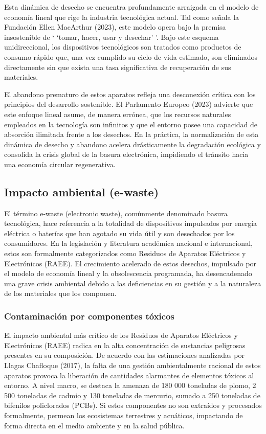 \documentclass[stu,12pt,a4paper]{apa7}
\begin{document}
Esta dinámica de desecho se encuentra profundamente arraigada en el modelo de economía lineal que rige la industria tecnológica actual. Tal como señala la Fundación Ellen MacArthur (2023), este modelo opera bajo la premisa insostenible de ` `tomar, hacer, usar y desechar' '. Bajo este esquema unidireccional, los dispositivos tecnológicos son tratados como productos de consumo rápido que, una vez cumplido su ciclo de vida estimado, son eliminados directamente sin que exista una tasa significativa de recuperación de sus materiales.

El abandono prematuro de estos aparatos refleja una desconexión crítica con los principios del desarrollo sostenible. El Parlamento Europeo (2023) advierte que este enfoque lineal asume, de manera errónea, que los recursos naturales empleados en la tecnología son infinitos y que el entorno posee una capacidad de absorción ilimitada frente a los desechos. En la práctica, la normalización de esta dinámica de desecho y abandono acelera drásticamente la degradación ecológica y consolida la crisis global de la basura electrónica, impidiendo el tránsito hacia una economía circular regenerativa.

\subsection{ Impacto ambiental (e-waste)}
El término e-waste (electronic waste), comúnmente denominado basura tecnológica, hace referencia a la totalidad de dispositivos impulsados por energía eléctrica o baterías que han agotado su vida útil y son desechados por los consumidores. En la legislación y literatura académica nacional e internacional, estos son formalmente categorizados como Residuos de Aparatos Eléctricos y Electrónicos (RAEE). El crecimiento acelerado de estos desechos, impulsado por el modelo de economía lineal y la obsolescencia programada, ha desencadenado una grave crisis ambiental debido a las deficiencias en su gestión y a la naturaleza de los materiales que los componen. 

    \subsubsection{Contaminación por componentes tóxicos}
     El impacto ambiental más crítico de los Residuos de Aparatos Eléctricos y Electrónicos (RAEE) radica en la alta concentración de sustancias peligrosas presentes en su composición. De acuerdo con las estimaciones analizadas por Llagas Chafloque (2017), la falta de una gestión ambientalmente racional de estos aparatos provoca la liberación de cantidades alarmantes de elementos tóxicos al entorno. A nivel macro, se destaca la amenaza de 180 000 toneladas de plomo, 2 500 toneladas de cadmio y 130 toneladas de mercurio, sumado a 250 toneladas de bifenilos policlorados (PCBs). Si estos componentes no son extraídos y procesados formalmente, permean los ecosistemas terrestres y acuáticos, impactando de forma directa en el medio ambiente y en la salud pública.
     
\end{document}
